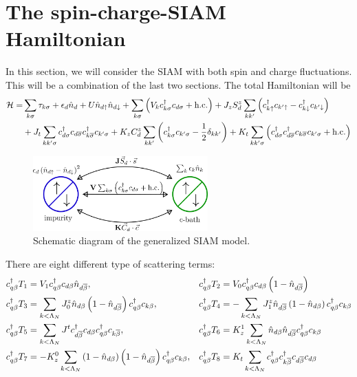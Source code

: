 \documentclass[12pt,twoside]{report}
\numberwithin{equation}{section}
\begin{document}
\section{The spin-charge-SIAM Hamiltonian}
In this section, we will consider the SIAM with both spin and charge fluctuations. This will be a combination of the last two sections. The total Hamiltonian will be
\begin{equation}\begin{aligned}
	\mathcal{H} =& \sum_{k\sigma}\tau_{k\sigma} + \epsilon_d \hat n_d + U \hat n_{d\uparrow}\hat n_{d \downarrow} + \sum_{k\sigma}\left( V_k c^\dagger_{k\sigma} c_{d\sigma} + \text{h.c.} \right) + J_z S_d^z\sum_{kk^\prime}\left( c^\dagger_{k \uparrow}c_{k^\prime \uparrow} - c^\dagger_{k \downarrow}c_{k^\prime \downarrow} \right) \\
	      &+ J_t \sum_{kk^\prime\sigma}c^\dagger_{d\sigma}c_{d\overline\sigma}c^\dagger_{k\overline\sigma}c_{k^\prime\sigma} + K_z C_d^z \sum_{kk^\prime}\left( c^\dagger_{k\sigma}c_{k^\prime\sigma} - \frac{1}{2}\delta_{kk^\prime} \right) + K_t \sum_{kk^\prime\sigma}\left(c^\dagger_{d\sigma}c^\dagger_{d\overline\sigma}c_{k\overline\sigma}c_{k^\prime\sigma}+\text{h.c.}\right)
\end{aligned}\end{equation}
\begin{figure}[htpb]
	\centering
	\includegraphics[width=0.6\textwidth]{../figures/gen_siam.png}
	\caption{Schematic diagram of the generalized SIAM model.}
\end{figure}
 There are eight different type of scattering terms:
\begin{equation}\begin{aligned}
	c^\dagger_{q\beta}T_1 &= V_1 c^\dagger_{q\beta}c_{d\beta}\hat n_{d\overline\beta}, &c^\dagger_{q\beta}T_2 &= V_0 c^\dagger_{q\beta}c_{d\beta}\left(1 - \hat n_{d\overline\beta}\right)\\
	c^\dagger_{q\beta}T_3 &= \sum_{k<\Lambda_N}J^z_0 \hat n_{d\beta}\left(1 - \hat n_{d\overline\beta}\right) c^\dagger_{q\beta}c_{k\beta}, &c^\dagger_{q\beta}T_4 &= -\sum_{k<\Lambda_N}J^z_1 \hat n_{d\overline\beta}\left(1 - \hat n_{d\beta}\right) c^\dagger_{q\beta}c_{k\beta}\\
	c^\dagger_{q\beta}T_5 &= \sum_{k<\Lambda_N}J^t c^\dagger_{d\overline\beta}c_{d\beta}c^\dagger_{q\beta}c_{k\overline\beta}, &c^\dagger_{q\beta}T_6 &= K_z^1 \sum_{k<\Lambda_N}\hat n_{d\beta}\hat n_{d\overline\beta}c^\dagger_{q\beta}c_{k\beta}\\
	c^\dagger_{q\beta}T_7 &= -K_z^0 \sum_{k<\Lambda_N}\left(1 - \hat n_{d\beta}\right)\left(1 - \hat n_{d\overline\beta}\right)c^\dagger_{q\beta}c_{k\beta}, &c^\dagger_{q\beta}T_8 &= K_t \sum_{k<\Lambda_N}c^\dagger_{q\beta}c^\dagger_{k\overline\beta}c_{d\overline\beta}c_{d\beta}\\
\end{aligned}\end{equation}
\end{document}
